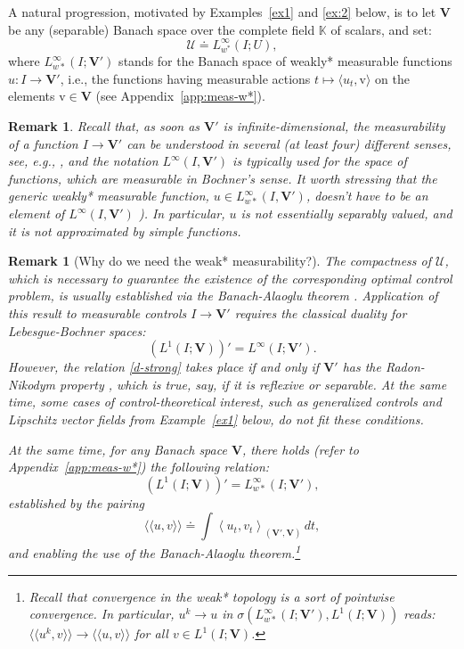 \documentclass[sn-mathphys-num]{sn-jnl}
\numberwithin{equation}{section}
\theoremstyle{mythm}
\theoremstyle{mydef}
\newtheorem{remark}[proposition]{Remark}
\renewcommand{\d}{\,d}
\begin{document}
A natural progression, motivated by Examples~\ref{ex1} and \ref{ex:2} below, is to let $\bm V$ be any (separable) Banach space over the complete field $\mathbb K$ of scalars, and set:
\[
{\mathcal U}\doteq {L}^\infty_{w^*}(I; U),
\]
where \(L^\infty_{w*}(I; \bm V')\) stands for the Banach space of weakly* measurable functions $u\colon I \to \bm V'$, i.e., the functions having measurable actions $t \mapsto \langle u_t, \mathrm v\rangle$ on the elements $\mathrm{v} \in \bm V$ (see Appendix~\ref{app:meas-w*}).
\begin{remark}
    Recall that, as soon as $\bm V'$ is infinite-dimensional, the measurability of a function $I \to \bm V'$ can be understood in several (at least four) different senses, see, e.g., \cite[Sec.~II]{diestel1977vector}, and the notation $L^\infty(I, \bm V')$ is typically used for the space of functions, which are measurable in Bochner's sense. It worth stressing that the generic weakly* measurable function, $u\in L^\infty_{w*}(I, \bm V')$, doesn't  have to be an element of $L^\infty(I, \bm V')$ \cite[Sec. II, Example 6]{diestel1977vector}). In particular, $u$ is not essentially separably valued, and it is not approximated by simple functions. 
\end{remark}
\begin{remark}[Why do we need the weak* measurability?]
    The compactness of $\mathcal U$, which is necessary to guarantee the existence of the corresponding optimal control problem, 
 is usually established via the Banach-Alaoglu theorem \cite[Theorem 1.2.1]{diestel1977vector}. Application of this result to measurable controls $I \to \bm V'$ requires the classical duality for Lebesgue-Bochner spaces:
\begin{equation}
(L^1(I; \bm V))' = {L}^\infty(I; \bm V').
\label{d-strong}    
\end{equation}
However, the relation \eqref{d-strong} takes place if and only if $\bm V'$ has the Radon-Nikodym property \cite[Sec. IV.1, Theorem 1]{diestel1977vector}, which is true, say, if it is reflexive or separable. At the same time, some cases of control-theoretical interest, such as generalized controls and Lipschitz vector fields from Example~\ref{ex1} below, do not fit these conditions.  

At the same time, for any Banach space $\bm V$, there holds (refer to Appendix~\ref{app:meas-w*}) the following relation:
\begin{equation}
({L}^1(I; \bm V))' = L^\infty_{w*}(I; \bm V'),
\label{d-w}    
\end{equation}
established by the pairing 
\begin{equation}
\langle\!\langle u, v \rangle\!\rangle \doteq \int \left\langle u_t, v_t\right\rangle_{(\bm V', \bm V)} \d t,
\label{wp*}
\end{equation} 
and enabling the use of the Banach-Alaoglu theorem.\footnote{Recall that convergence in the weak* topology is a sort of pointwise convergence. In particular, $u^k\to u$ in $\sigma({L}^\infty_{w*}(I; \bm V'), {L}^1(I; \bm V))$ reads:
$\langle\!\langle u^k, v \rangle\!\rangle \to  \langle\!\langle u, v \rangle\!\rangle$ for all \(v \in {L}^1(I; \bm V)\).}
\end{remark}
\end{document}

